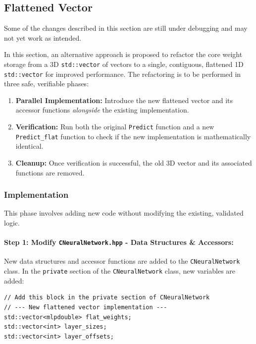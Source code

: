 \documentclass{article}
\begin{document}
\subsection{Flattened Vector}
\label{subsec:flat}
\begin{tcolorbox}[colback=bg,colframe=red!60!black,title=Disclaimer]
Some of the changes described in this section are still under debugging and may not yet work as intended.
\end{tcolorbox}
In this section, an alternative approach is proposed to refactor the core weight storage from a 3D \texttt{std::vector} of vectors to a single, contiguous, flattened 1D \texttt{std::vector} for improved performance. The refactoring is to be performed in three safe, verifiable phases:
\begin{enumerate}
    \item \textbf{Parallel Implementation:} Introduce the new flattened vector and its accessor functions \emph{alongside} the existing implementation.
    \item \textbf{Verification:} Run both the original \texttt{Predict} function and a new \texttt{Predict\_flat} function to check if the new implementation is mathematically identical.
    \item \textbf{Cleanup:} Once verification is successful, the old 3D vector and its associated functions are removed.
\end{enumerate}

\subsubsection{Implementation}
This phase involves adding new code without modifying the existing, validated logic.
\paragraph{Step 1: Modify \texttt{CNeuralNetwork.hpp} - Data Structures \& Accessors:}

New data structures and accessor functions are added to the \texttt{CNeuralNetwork} class. In the \texttt{private} section of the \texttt{CNeuralNetwork} class, new variables are added:

\begin{verbatim}
// Add this block in the private section of CNeuralNetwork
// --- New flattened vector implementation ---
std::vector<mlpdouble> flat_weights;
std::vector<int> layer_sizes;
std::vector<int> layer_offsets;
\end{verbatim}
\end{document}
